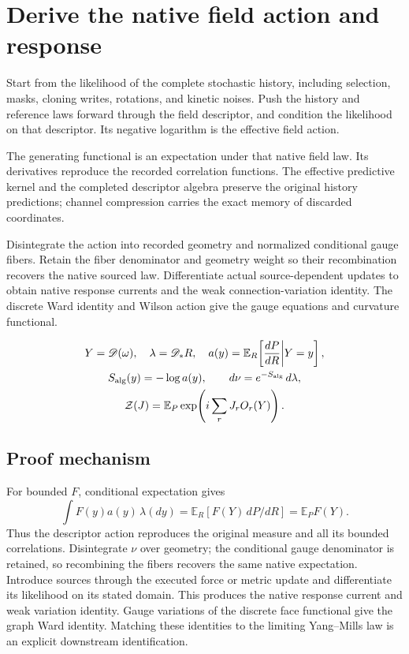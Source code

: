 \documentclass[11pt,a4paper]{article}
\begin{document}
\section{Derive the native field action and response}
\label{stage:12}
Start from the likelihood of the complete stochastic history, including selection, masks, cloning writes, rotations, and kinetic noises. Push the history and reference laws forward through the field descriptor, and condition the likelihood on that descriptor. Its negative logarithm is the effective field action.

The generating functional is an expectation under that native field law. Its derivatives reproduce the recorded correlation functions. The effective predictive kernel and the completed descriptor algebra preserve the original history predictions; channel compression carries the exact memory of discarded coordinates.

Disintegrate the action into recorded geometry and normalized conditional gauge fibers. Retain the fiber denominator and geometry weight so their recombination recovers the native sourced law. Differentiate actual source-dependent updates to obtain native response currents and the weak connection-variation identity. The discrete Ward identity and Wilson action give the gauge equations and curvature functional.


\begin{gather*}
Y=\mathscr D(\omega),\quad \lambda=\mathscr D_*R,\quad
a(y)=\mathbb E_R\!\left[\frac{dP}{dR}\middle|Y=y\right],\\
S_{\rm alg}(y)=-\log a(y),\qquad d\nu=e^{-S_{\rm alg}}\,d\lambda,\\
\mathcal Z(J)=\mathbb E_P\exp\!\left(i\sum_rJ_rO_r(Y)\right).
\end{gather*}
\subsection*{Proof mechanism}
For bounded \(F\), conditional expectation gives
\[\int F(y)a(y)\,\lambda(dy)=\mathbb E_R[F(Y)\,dP/dR]=\mathbb E_PF(Y).\]
Thus the descriptor action reproduces the original measure and all its bounded correlations. Disintegrate \(\nu\) over geometry; the conditional gauge denominator is retained, so recombining the fibers recovers the same native expectation. Introduce sources through the executed force or metric update and differentiate its likelihood on its stated domain. This produces the native response current and weak variation identity. Gauge variations of the discrete face functional give the graph Ward identity. Matching these identities to the limiting Yang--Mills law is an explicit downstream identification.
\end{document}
